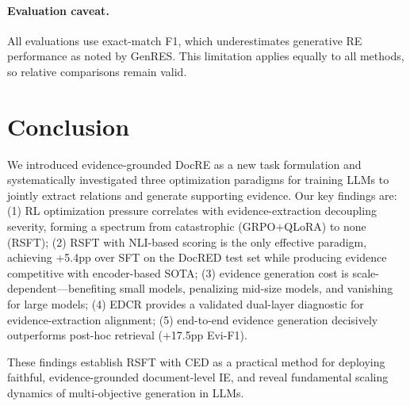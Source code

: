 \documentclass[11pt,a4paper]{article}
\begin{document}
\paragraph{Evaluation caveat.}
All evaluations use exact-match F1, which underestimates generative RE performance as noted by GenRES.
This limitation applies equally to all methods, so relative comparisons remain valid.

\section{Conclusion}

We introduced evidence-grounded DocRE as a new task formulation and systematically investigated three optimization paradigms for training LLMs to jointly extract relations and generate supporting evidence.
Our key findings are:
(1) RL optimization pressure correlates with evidence-extraction decoupling severity, forming a spectrum from catastrophic (GRPO+QLoRA) to none (RSFT);
(2) RSFT with NLI-based scoring is the only effective paradigm, achieving +5.4pp over SFT on the DocRED test set while producing evidence competitive with encoder-based SOTA;
(3) evidence generation cost is scale-dependent---benefiting small models, penalizing mid-size models, and vanishing for large models;
(4) EDCR provides a validated dual-layer diagnostic for evidence-extraction alignment;
(5) end-to-end evidence generation decisively outperforms post-hoc retrieval (+17.5pp Evi-F1).

These findings establish RSFT with CED as a practical method for deploying faithful, evidence-grounded document-level IE, and reveal fundamental scaling dynamics of multi-objective generation in LLMs.
\end{document}
